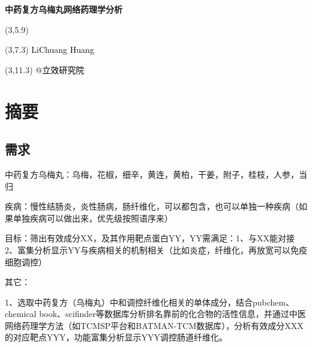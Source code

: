 \documentclass[
]{article}
\author{}
\date{\vspace{-2.5em}}
\begin{document}
\begin{titlepage} 
\begin{center} \textbf{\Huge
中药复方乌梅丸网络药理学分析} \vspace{4em}
\begin{textblock}{10}(3,5.9) \huge
\textbf{\textcolor{white}{2024-04-08}}
\end{textblock} \begin{textblock}{10}(3,7.3)
\Large \textcolor{black}{LiChuang Huang}
\end{textblock} \begin{textblock}{10}(3,11.3)
\Large \textcolor{black}{@立效研究院}
\end{textblock} \end{center} \end{titlepage}
\restoregeometry


\tableofcontents

\listoffigures

\listoftables

\newpage


\hypertarget{abstract}{%
\section{摘要}\label{abstract}}

\hypertarget{ux9700ux6c42}{%
\subsection{需求}\label{ux9700ux6c42}}

中药复方乌梅丸：乌梅，花椒，细辛，黄连，黄柏，干姜，附子，桂枝，人参，当归

疾病：慢性结肠炎，炎性肠病，肠纤维化，可以都包含，也可以单独一种疾病（如果单独疾病可以做出来，优先级按照语序来）

目标：筛出有效成分XX，及其作用靶点蛋白YY，YY需满足：1、与XX能对接 2、富集分析显示YY与疾病相关的机制相关（比如炎症，纤维化，再放宽可以免疫细胞调控）

其它：

1、选取中药复方（乌梅丸）中和调控纤维化相关的单体成分，结合pubchem、chemical book、scifinder等数据库分析排名靠前的化合物的活性信息，并通过中医网络药理学方法（如TCMSP平台和BATMAN-TCM数据库），分析有效成分XXX的对应靶点YYY，功能富集分析显示YYY调控肠道纤维化。
\end{document}
